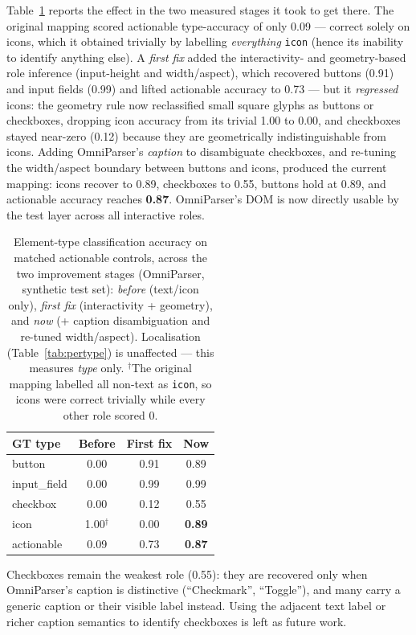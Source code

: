 \documentclass[11pt,a4paper]{article}
\newcommand{\code}[1]{\texttt{#1}}
\begin{document}
Table~\ref{tab:typeacc} reports the effect in the two measured stages it took to
get there. The original mapping scored actionable type-accuracy of only 0.09 ---
correct solely on icons, which it obtained trivially by labelling \emph{everything}
\code{icon} (hence its inability to identify anything else). A \emph{first fix} added
the interactivity- and geometry-based role inference (input-height and width/aspect),
which recovered buttons (0.91) and input fields (0.99) and lifted actionable accuracy
to 0.73 --- but it \emph{regressed} icons: the geometry rule now reclassified small
square glyphs as buttons or checkboxes, dropping icon accuracy from its trivial 1.00
to 0.00, and checkboxes stayed near-zero (0.12) because they are geometrically
indistinguishable from icons. Adding OmniParser's \emph{caption} to disambiguate
checkboxes, and re-tuning the width/aspect boundary between buttons and icons,
produced the current mapping: icons recover to 0.89, checkboxes to 0.55, buttons
hold at 0.89, and actionable accuracy reaches \textbf{0.87}. OmniParser's DOM is now
directly usable by the test layer across all interactive roles.

\begin{table}[H]
  \centering
  \caption{Element-type classification accuracy on matched actionable controls,
  across the two improvement stages (OmniParser, synthetic test set):
  \emph{before} (text/icon only), \emph{first fix} (interactivity + geometry), and
  \emph{now} (+ caption disambiguation and re-tuned width/aspect). Localisation
  (Table~\ref{tab:pertype}) is unaffected --- this measures \emph{type} only.
  $^\dagger$The original mapping labelled all non-text as \code{icon}, so icons were
  correct trivially while every other role scored 0.}
  \label{tab:typeacc}
  \begin{tabular}{lccc}
    \toprule
    GT type & Before & First fix & Now \\
    \midrule
    button       & 0.00 & 0.91 & 0.89 \\
    input\_field & 0.00 & 0.99 & 0.99 \\
    checkbox     & 0.00 & 0.12 & 0.55 \\
    icon         & 1.00$^\dagger$ & 0.00 & \textbf{0.89} \\
    \midrule
    actionable   & 0.09 & 0.73 & \textbf{0.87} \\
    \bottomrule
  \end{tabular}
\end{table}

Checkboxes remain the weakest role (0.55): they are recovered only when OmniParser's
caption is distinctive (``Checkmark'', ``Toggle''), and many carry a generic caption
or their visible label instead. Using the adjacent text label or richer caption
semantics to identify checkboxes is left as future work.
\end{document}
